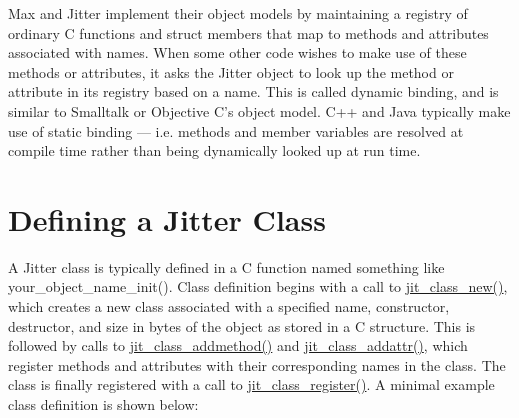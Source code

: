 Max and Jitter implement their object models by maintaining a registry of ordinary C functions and struct members that map to methods and attributes associated with names. When some other code wishes to make use of these methods or attributes, it asks the Jitter object to look up the method or attribute in its registry based on a name. This is called dynamic binding, and is similar to Smalltalk or Objective C's object model. C++ and Java typically make use of static binding — i.e. methods and member variables are resolved at compile time rather than being dynamically looked up at run time.\hypertarget{chapter_jit_objectmodel_chapter_jit_objectmodel_classdef}{}\section{Defining a Jitter Class}\label{chapter_jit_objectmodel_chapter_jit_objectmodel_classdef}
A Jitter class is typically defined in a C function named something like your\_\-object\_\-name\_\-init(). Class definition begins with a call to \hyperlink{group__classmod_ga6c1c213a5c883bf32d0f22678ce2f02b}{jit\_\-class\_\-new()}, which creates a new class associated with a specified name, constructor, destructor, and size in bytes of the object as stored in a C structure. This is followed by calls to \hyperlink{group__classmod_gab3b84bc08f9f3ee0b29010f653c5ea77}{jit\_\-class\_\-addmethod()} and \hyperlink{group__classmod_ga37e39db544b4d73596da1557e6c7563a}{jit\_\-class\_\-addattr()}, which register methods and attributes with their corresponding names in the class. The class is finally registered with a call to \hyperlink{group__classmod_ga1cf03eba09d7b3b53a8cde269c47765d}{jit\_\-class\_\-register()}. A minimal example class definition is shown below:



